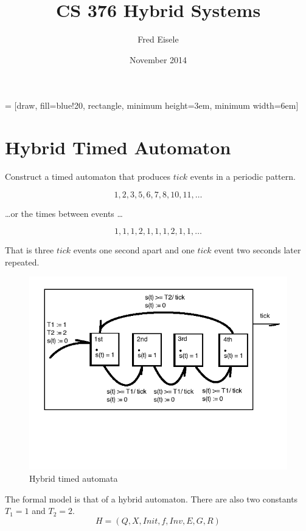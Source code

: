 \documentclass{article}
\title{CS 376 Hybrid Systems}
\author{Fred Eisele}
\date{November 2014}
\begin{document}
\maketitle

 = [draw, fill=blue!20, rectangle,
    minimum height=3em, minimum width=6em]


\section{Hybrid Timed Automaton}
Construct a timed automaton that produces $tick$
events in a periodic pattern.

\begin{equation}
1, 2, 3, 5, 6, 7 ,8, 10, 11, \ldots
\end{equation}

\ldots or the times between events \ldots

\begin{equation}
1, 1, 1, 2, 1, 1, 1, 2, 1, 1, \ldots
\end{equation}

That is three $tick$ events one second apart
and one $tick$ event two seconds later repeated.

\begin{figure}[h!]
\centering
\includegraphics[scale=0.7]{hw7_1_actor_detail.png}
\caption{Hybrid timed automata}
\label{fig:time_automata}
\end{figure}

The formal model is that of a hybrid automaton.
There are also two constants $T_1 = 1$ and $T_2 = 2$.
\begin{equation}
H = (Q, X, Init, f, Inv, E, G, R)
\end{equation}
\end{document}
